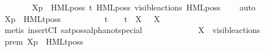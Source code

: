\begin{isabellebody}
\ \ \ \ \ \ \isamarkupfalse%
\ {\isacartoucheopen}{\isasymtheta}{\isacharbrackleft}{\kern0pt}X{\isacharbrackright}{\kern0pt}{\isacharparenleft}{\kern0pt}p{\isacharparenright}{\kern0pt}\ {\isasymTurnstile}\ HML{\isacharunderscore}{\kern0pt}poss\ t{\isacharunderscore}{\kern0pt}{\isasymepsilon}\ {\isacharparenleft}{\kern0pt}HML{\isacharunderscore}{\kern0pt}poss\ {\isacharparenleft}{\kern0pt}{\isasymepsilon}{\isacharbrackleft}{\kern0pt}visible{\isacharunderscore}{\kern0pt}actions{\isacharbrackright}{\kern0pt}{\isacharparenright}{\kern0pt}\ {\isacharparenleft}{\kern0pt}HML{\isacharunderscore}{\kern0pt}poss\ {\isasymalpha}\ {\isasymsigma}{\isacharparenleft}{\kern0pt}{\isasymphi}{\isacharparenright}{\kern0pt}{\isacharparenright}{\kern0pt}{\isacharparenright}{\kern0pt}{\isacartoucheclose}\ \isamarkupfalse%
\ auto\isanewline
\isanewline
\ \ \ \ \ \ \isamarkupfalse%
\ {\isacartoucheopen}{\isasymtheta}{\isacharbrackleft}{\kern0pt}X{\isacharbrackright}{\kern0pt}{\isacharparenleft}{\kern0pt}p{\isacharparenright}{\kern0pt}\ {\isasymTurnstile}\ {\isasymsigma}{\isacharparenleft}{\kern0pt}HMLt{\isacharunderscore}{\kern0pt}poss\ {\isasymalpha}\ {\isasymphi}{\isacharparenright}{\kern0pt}{\isacartoucheclose}\ \isamarkupfalse%
\ {\isacartoucheopen}{\isasymalpha}\ {\isasymnoteq}\ {\isasymtau}\ {\isasymand}\ {\isasymalpha}\ {\isasymnoteq}\ t\ {\isasymand}\ {\isasymalpha}\ {\isasymnoteq}\ t{\isacharunderscore}{\kern0pt}{\isasymepsilon}\ {\isasymand}\ {\isacharparenleft}{\kern0pt}{\isasymforall}X{\isachardot}{\kern0pt}\ {\isasymalpha}\ {\isasymnoteq}\ {\isasymepsilon}{\isacharbrackleft}{\kern0pt}X{\isacharbrackright}{\kern0pt}{\isacharparenright}{\kern0pt}{\isacartoucheclose}\isanewline
\ \ \ \ \ \ \ \ \isamarkupfalse%
\ {\isacharparenleft}{\kern0pt}metis\ insertCI\ sat{\isacharunderscore}{\kern0pt}poss{\isacharunderscore}{\kern0pt}alpha{\isacharunderscore}{\kern0pt}not{\isacharunderscore}{\kern0pt}special{\isacharparenright}{\kern0pt}\isanewline
\ \ \ \ \isamarkupfalse%
\isanewline
\ \ \isamarkupfalse%
\isanewline
\ \ \ \ \isamarkupfalse%
\ {\isacartoucheopen}X\ {\isasymsubseteq}\ visible{\isacharunderscore}{\kern0pt}actions{\isacartoucheclose}\isanewline
\ \ \ \ \isamarkupfalse%
\ prem{\isacharcolon}{\kern0pt}\ {\isacartoucheopen}{\isasymtheta}{\isacharbrackleft}{\kern0pt}X{\isacharbrackright}{\kern0pt}{\isacharparenleft}{\kern0pt}p{\isacharparenright}{\kern0pt}\ {\isasymTurnstile}\ {\isasymsigma}{\isacharparenleft}{\kern0pt}HMLt{\isacharunderscore}{\kern0pt}poss\ {\isasymalpha}\ {\isasymphi}{\isacharparenright}{\kern0pt}{\isacartoucheclose}\isanewline

\end{isabellebody}
